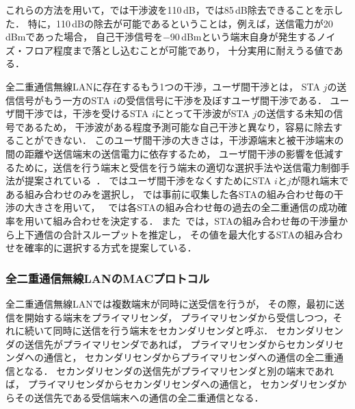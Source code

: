 \documentclass[master]{kuisthesis}		%
\begin{document}
			\par
			これらの方法を用いて，\cite{stanford1}では干渉波を110\,dB，\cite{fdmac}では85\,dB除去できることを示した．
			特に，110\,dBの除去が可能であるということは，例えば，送信電力が20\,dBmであった場合，
			自己干渉信号を$-$90\,dBmという端末自身が発生するノイズ・フロア程度まで落とし込むことが可能であり，
			十分実用に耐えうる値である．
			\par
			全二重通信無線LANに存在するもう1つの干渉，ユーザ間干渉とは，
			STA $j$の送信信号がもう一方のSTA $i$の受信信号に干渉を及ぼすユーザ間干渉である．
			ユーザ間干渉では，干渉を受けるSTA $i$にとって干渉波がSTA $j$の送信する未知の信号であるため，
			干渉波がある程度予測可能な自己干渉と異なり，容易に除去することができない．
			このユーザ間干渉の大きさは，干渉源端末と被干渉端末の間の距離や送信端末の送信電力に依存するため，
			ユーザ間干渉の影響を低減するために，送信を行う端末と受信を行う端末の適切な選択手法や送信電力制御手法が提案されている~\cite{fdmac3, goyal, janus, contra, promac}．
			\cite{fdmac3}ではユーザ間干渉をなくすためにSTA $i$と$j$が隠れ端末である組み合わせのみを選択し，
			\cite{goyal, janus}では事前に収集した各STAの組み合わせ毎の干渉の大きさを用いて，
			~\cite{contra}では各STAの組み合わせ毎の過去の全二重通信の成功確率を用いて組み合わせを決定する．
			また~\cite{promac}では，STAの組み合わせ毎の干渉量から上下通信の合計スループットを推定し，
			その値を最大化するSTAの組み合わせを確率的に選択する方式を提案している．
		\subsubsection{全二重通信無線LANのMACプロトコル}
			全二重通信無線LANでは複数端末が同時に送受信を行うが，
			その際，最初に送信を開始する端末をプライマリセンダ，
			プライマリセンダから受信しつつ，それに続いて同時に送信を行う端末をセカンダリセンダと呼ぶ．
			セカンダリセンダの送信先がプライマリセンダであれば，
			プライマリセンダからセカンダリセンダへの通信と，
			セカンダリセンダからプライマリセンダへの通信の全二重通信となる．
			セカンダリセンダの送信先がプライマリセンダと別の端末であれば，
			プライマリセンダからセカンダリセンダへの通信と，
			セカンダリセンダからその送信先である受信端末への通信の全二重通信となる．
\end{document}
